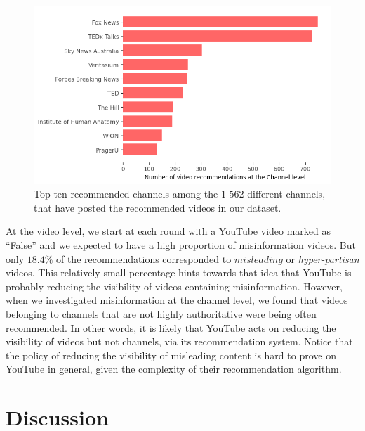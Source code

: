 \documentclass{article}
\begin{document}
\begin{figure}[h]
	\begin{center}
		\includegraphics[scale=0.6]{./img/channel_youtube.png} 
	\end{center}
	\caption{Top ten recommended channels among the $1$ $562$ different channels, that have posted the recommended videos in our dataset.}
	\label{channels_yt}
\end{figure}

\smallskip 

At the video level, we start at each round with a YouTube video marked as ``False'' and we expected to have a high proportion of misinformation videos. But only {$18.4\%$} of the recommendations corresponded to $misleading$ or {\it hyper-partisan} videos.
This relatively small percentage hints towards that idea that YouTube is probably reducing the visibility of videos containing misinformation. However, when we investigated misinformation at the channel level, we found that videos belonging to channels that are not highly authoritative were being often recommended. In other words, it is likely that YouTube acts on reducing the visibility of videos but not channels, via its recommendation system. Notice that the policy of reducing the visibility of misleading content is hard to prove on YouTube in general, given the complexity of their recommendation algorithm.

\section{Discussion}
\end{document}
